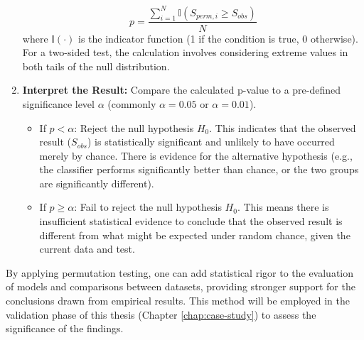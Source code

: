\begin{enumerate}
        \begin{equation}
          p = \frac{\sum_{i=1}^{N} \mathbb{I}(S_{perm, i} \ge S_{obs})}{N}
          \label{eq:pvalue_perm}
        \end{equation}
        where $\mathbb{I}(\cdot)$ is the indicator function (1 if the condition is true, 0 otherwise). For a two-sided test, the calculation involves considering extreme values in both tails of the null distribution.
  \item \textbf{Interpret the Result:} Compare the calculated p-value to a pre-defined significance level $\alpha$ (commonly $\alpha = 0.05$ or $\alpha = 0.01$).
        \begin{itemize}
          \item If $p < \alpha$: Reject the null hypothesis $H_0$. This indicates that the observed result ($S_{obs}$) is statistically significant and unlikely to have occurred merely by chance. There is evidence for the alternative hypothesis (e.g., the classifier performs significantly better than chance, or the two groups are significantly different).
          \item If $p \ge \alpha$: Fail to reject the null hypothesis $H_0$. This means there is insufficient statistical evidence to conclude that the observed result is different from what might be expected under random chance, given the current data and test.
        \end{itemize}
\end{enumerate}

By applying permutation testing, one can add statistical rigor to the evaluation of models and comparisons between datasets, providing stronger support for the conclusions drawn from empirical results. This method will be employed in the validation phase of this thesis (Chapter \autoref{chap:case-study}) to assess the significance of the findings.